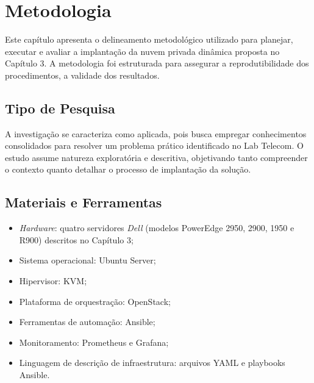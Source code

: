 
\chapter{Metodologia}
\setcounter{table}{0}

Este capítulo apresenta o delineamento metodológico utilizado para planejar, executar e avaliar a implantação da nuvem privada dinâmica proposta no Capítulo 3. A metodologia foi estruturada para assegurar a reprodutibilidade dos procedimentos, a validade dos resultados.

\section{Tipo de Pesquisa}
A investigação se caracteriza como aplicada, pois busca empregar conhecimentos consolidados para resolver um problema prático identificado no Lab Telecom. O estudo assume natureza exploratória e descritiva, objetivando tanto compreender o contexto quanto detalhar o processo de implantação da solução.

\section{Materiais e Ferramentas}
\begin{itemize}
    \item \textit{Hardware}: quatro servidores \textit{Dell} (modelos PowerEdge 2950, 2900, 1950 e R900) descritos no Capítulo 3;
    \item Sistema operacional: Ubuntu Server;
    \item Hipervisor: KVM;
    \item Plataforma de orquestração: OpenStack;
    \item Ferramentas de automação: Ansible;
    \item Monitoramento: Prometheus e Grafana;
    \item Linguagem de descrição de infraestrutura: arquivos YAML e playbooks Ansible.
\end{itemize}

